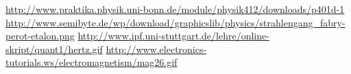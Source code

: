 \url{http://www.praktika.physik.uni-bonn.de/module/physik412/downloads/p401d-1}
\url{http://www.semibyte.de/wp/download/graphicslib/physics/strahlengang_fabry-perot-etalon.png}
\url{http://www.ipf.uni-stuttgart.de/lehre/online-skript/quant1/hertz.gif}
\url{http://www.electronics-tutorials.ws/electromagnetism/mag26.gif}
